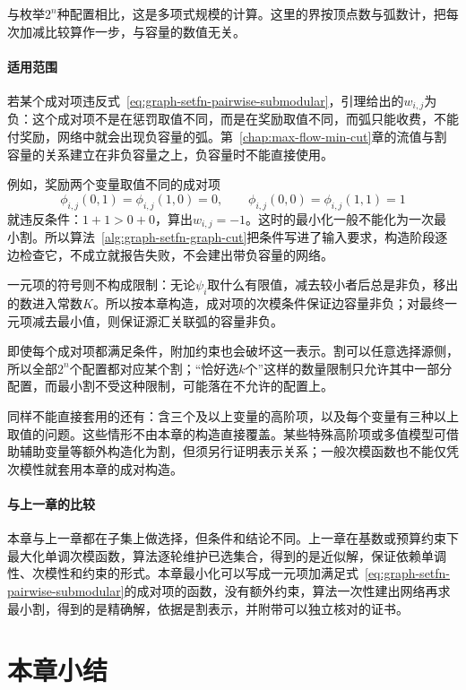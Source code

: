 与枚举$2^n$种配置相比，这是多项式规模的计算。这里的界按顶点数与弧数计，把每次加减比较算作一步，与容量的数值无关。

\paragraph{适用范围}
若某个成对项违反式~\eqref{eq:graph-setfn-pairwise-submodular}，引理给出的$w_{i,j}$为负：这个成对项不是在惩罚取值不同，而是在奖励取值不同，而弧只能收费，不能付奖励，网络中就会出现负容量的弧。第~\ref{chap:max-flow-min-cut}章的流值与割容量的关系建立在非负容量之上，负容量时不能直接使用。

例如，奖励两个变量取值不同的成对项
\[
 \phi_{i,j}(0,1)=\phi_{i,j}(1,0)=0,\qquad \phi_{i,j}(0,0)=\phi_{i,j}(1,1)=1
\]
就违反条件：$1+1>0+0$，算出$w_{i,j}=-1$。这时的最小化一般不能化为一次最小割。所以算法~\ref{alg:graph-setfn-graph-cut}把条件写进了输入要求，构造阶段逐边检查它，不成立就报告失败，不会建出带负容量的网络。

一元项的符号则不构成限制：无论$\psi_i$取什么有限值，减去较小者后总是非负，移出的数进入常数$K$。所以按本章构造，成对项的次模条件保证边容量非负；对最终一元项减去最小值，则保证源汇关联弧的容量非负。

即使每个成对项都满足条件，附加约束也会破坏这一表示。割可以任意选择源侧，所以全部$2^n$个配置都对应某个割；“恰好选$k$个”这样的数量限制只允许其中一部分配置，而最小割不受这种限制，可能落在不允许的配置上。

同样不能直接套用的还有：含三个及以上变量的高阶项，以及每个变量有三种以上取值的问题。这些情形不由本章的构造直接覆盖。某些特殊高阶项或多值模型可借助辅助变量等额外构造化为割，但须另行证明表示关系；一般次模函数也不能仅凭次模性就套用本章的成对构造。

\paragraph{与上一章的比较}
本章与上一章都在子集上做选择，但条件和结论不同。上一章在基数或预算约束下最大化单调次模函数，算法逐轮维护已选集合，得到的是近似解，保证依赖单调性、次模性和约束的形式。本章最小化可以写成一元项加满足式~\eqref{eq:graph-setfn-pairwise-submodular}的成对项的函数，没有额外约束，算法一次性建出网络再求最小割，得到的是精确解，依据是割表示，并附带可以独立核对的证书。

\FloatBarrier
\section{本章小结}
\label{sec:pairwise-binary-chapter-summary}

